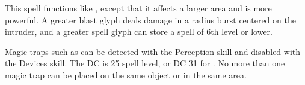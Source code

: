 \begin{spelleffect}
This spell functions like , except that it affects a larger area and is more powerful. A greater blast glyph deals damage in a \areamed radius burst centered on the intruder, and a greater spell glyph can store a spell of 6th level or lower.
\end{spelleffect}
\begin{spellnotes}
\par Magic traps such as  can be detected with the Perception skill and disabled with the Devices skill. The DC is 25 \add spell level, or DC 31 for . No more than one magic trap can be placed on the same object or in the same area.
\end{spellnotes}

